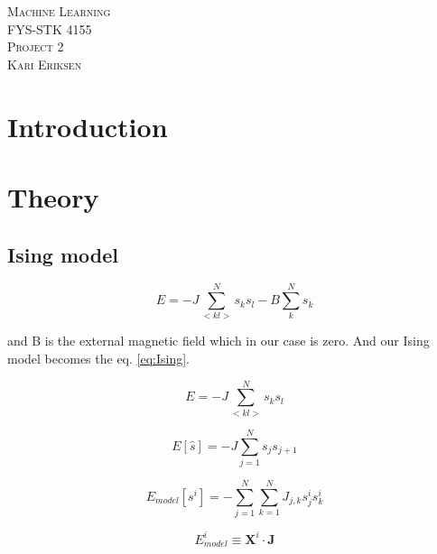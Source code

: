 \documentclass[a4paper,12pt, english]{article}
\begin{document}
\begin{titlepage}
\begin{center}
\textsc{\Large Machine Learning}\\[0.2cm]
\textsc{FYS-STK 4155}\\[1.0cm]
\textsc{\Large Project 2}\\[0.2cm]
\textsc{Kari Eriksen}\\[1.0cm]

\begin{abstract}

\end{abstract}

\end{center}
\end{titlepage}

\tableofcontents

\newpage

\section{Introduction}

\section{Theory}

\subsection{Ising model}

\begin{equation}
E = -J \sum_{<kl>}^N s_k s_l - B \sum_k^N s_k
\end{equation}

and B is the external magnetic field which in our case is zero. And our Ising model becomes the eq. \ref{eq:Ising}.

\begin{equation} \label{eq:Ising}
E = -J \sum_{<kl>}^N s_k s_l
\end{equation}

\begin{equation}
E[\hat{s}] = -J \sum_{j=1}^N s_j s_{j+1}
\end{equation}

\begin{equation}
E_{model}[s^i] = -\sum_{j=1}^N \sum_{k=1}^N J_{j,k} s_j^i s_k^i
\end{equation}

\begin{equation}
E_{model}^i \equiv \mathbf{X}^i \cdot \mathbf{J}
\end{equation}
\end{document}
